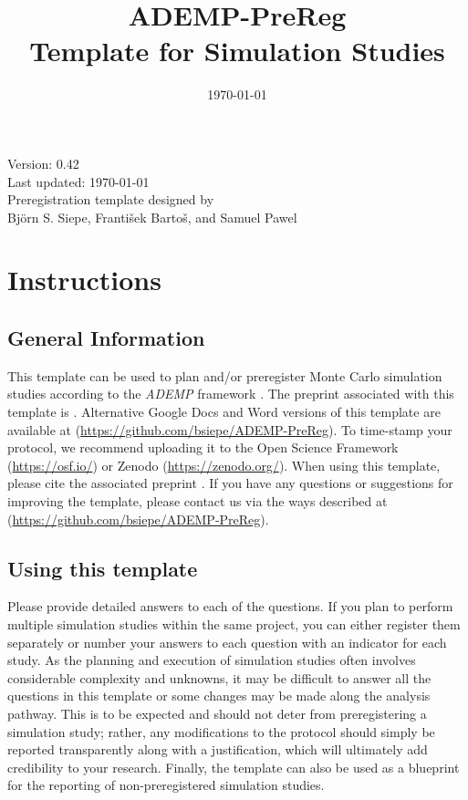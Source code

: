 \documentclass[12pt]{article}
\title{ADEMP-PreReg \\ Template for Simulation Studies}
\date{\today}
\begin{document}
\begin{titlepage}
    \maketitle
    \thispagestyle{empty}
    \vfill
    \centering
    Version: 0.42 \\
    Last updated: \today \\ %
    Preregistration template designed by \\
    Björn S. Siepe, František Bartoš, and Samuel Pawel \\
    \vfill
\end{titlepage}

\newpage



\section{Instructions}
\subsection*{General Information}
This template can be used to plan and/or preregister Monte Carlo simulation studies according to the \textit{ADEMP} framework \parencite{Morris2019}. The preprint associated with this template is \parencite{Siepe2023}. Alternative Google Docs and Word versions of this template are available at (\url{https://github.com/bsiepe/ADEMP-PreReg}). To time-stamp your protocol, we recommend uploading it to the Open Science Framework (\url{https://osf.io/}) or Zenodo (\url{https://zenodo.org/}). When using this template, please cite the associated preprint \parencite{Siepe2023}. If you have any questions or suggestions for improving the template, please contact us via the ways described at (\url{https://github.com/bsiepe/ADEMP-PreReg}). \\

\subsection*{Using this template}
Please provide detailed answers to each of the questions. If you plan to perform multiple simulation studies within the same project, you can either register them separately or number your answers to each question with an indicator for each study. As the planning and execution of simulation studies often involves considerable complexity and unknowns, it may be difficult to answer all the questions in this template or some changes may be made along the analysis pathway. This is to be expected and should not deter from preregistering a simulation study; rather, any modifications to the protocol should simply be reported transparently along with a justification, which will ultimately add credibility to your research. Finally, the template can also be used as a blueprint for the reporting of non-preregistered simulation studies.
\end{document}
